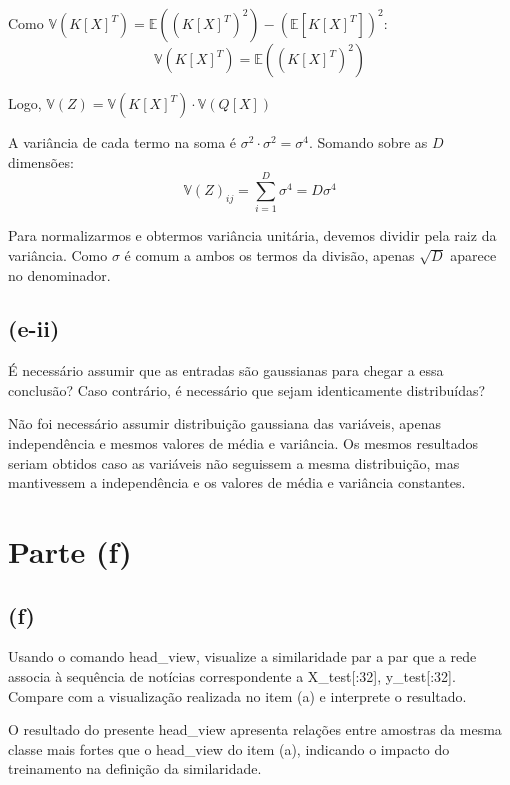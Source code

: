 \noindent Como $\mathbb{V}(K[X]^T) = \mathbb{E}\left((K[X]^T)^2\right) - (\mathbb{E}[K[X]^T])^2$:
\begin{equation*}
    \mathbb{V}(K[X]^T) = \mathbb{E}\left((K[X]^T)^2\right)
\end{equation*}

\noindent Logo, $\mathbb{V}(Z) = \mathbb{V}(K[X]^T) \cdot \mathbb{V}(Q[X])$

\noindent A variância de cada termo na soma é $\sigma^2 \cdot \sigma^2 = \sigma^4$. Somando sobre as $D$ dimensões:
\begin{equation*}
    \mathbb{V}(Z)_{ij} = \sum_{i=1}^D \sigma^4 = D\sigma^4
\end{equation*}

\noindent Para normalizarmos e obtermos variância unitária, devemos dividir pela raiz da variância. Como $\sigma$ é comum a ambos os termos da divisão, apenas $\sqrt{D}$ aparece no denominador.

\subsection*{(e-ii)}
É necessário assumir que as entradas são gaussianas para chegar a essa conclusão? Caso contrário, é necessário que sejam identicamente distribuídas?

\vspace{0.5em}
\noindent Não foi necessário assumir distribuição gaussiana das variáveis, apenas independência e mesmos valores de média e variância. Os mesmos resultados seriam obtidos caso as variáveis não seguissem a mesma distribuição, mas mantivessem a independência e os valores de média e variância constantes.

\section*{Parte (f)}

\subsection*{(f)}
Usando o comando head\_view, visualize a similaridade par a par que a rede associa à sequência de notícias correspondente a X\_test[:32], y\_test[:32]. Compare com a visualização realizada no item (a) e interprete o resultado.

\vspace{0.5em}
\noindent O resultado do presente head\_view apresenta relações entre amostras da mesma classe mais fortes que o head\_view do item (a), indicando o impacto do treinamento na definição da similaridade.

